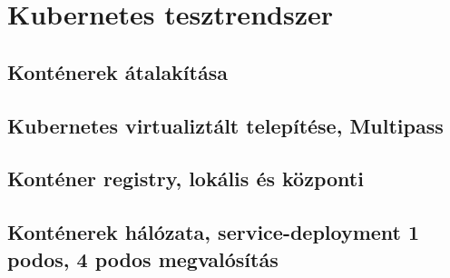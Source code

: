 \chapter{Kubernetes tesztrendszer}

\section{Konténerek átalakítása}

\section{Kubernetes virtualiztált telepítése, Multipass}

\section{Konténer registry, lokális és központi}

\section{Konténerek hálózata, service-deployment 1 podos, 4 podos megvalósítás}
